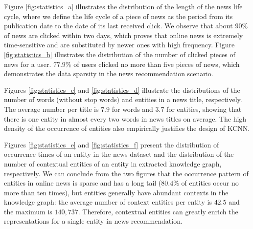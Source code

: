 \documentclass[sigconf]{acmart}
\begin{document}
		Figure \ref{fig:statistics_a} illustrates the distribution of the length of the news life cycle, where we define the life cycle of a piece of news as the period from its publication date to the date of its last received click.
		We observe that about $90\%$ of news are clicked within two days, which proves that online news is extremely time-sensitive and are substituted by newer ones with high frequency.
		Figure \ref{fig:statistics_b} illustrates the distribution of the number of clicked pieces of news for a user.
		$77.9\%$ of users clicked no more than five pieces of news, which demonstrates the data sparsity in the news recommendation scenario.
		
		Figures \ref{fig:statistics_c} and \ref{fig:statistics_d} illustrate the distributions of the number of words (without stop words) and entities in a news title, respectively.
		The average number per title is $7.9$ for words and $3.7$ for entities, showing that there is one entity in almost every two words in news titles on average.
		The high density of the occurrence of entities also empirically justifies the design of KCNN.
		
		Figures \ref{fig:statistics_e} and \ref{fig:statistics_f} present the distribution of occurrence times of an entity in the news dataset and the distribution of the number of contextual entities of an entity in extracted knowledge graph, respectively.
		We can conclude from the two figures that the occurrence pattern of entities in online news is sparse and has a long tail ($80.4\%$ of entities occur no more than ten times), but entities generally have abundant contexts in the knowledge graph: the average number of context entities per entity is $42.5$ and the maximum is $140,737$.
		Therefore, contextual entities can greatly enrich the representations for a single entity in news recommendation.
		
\end{document}
